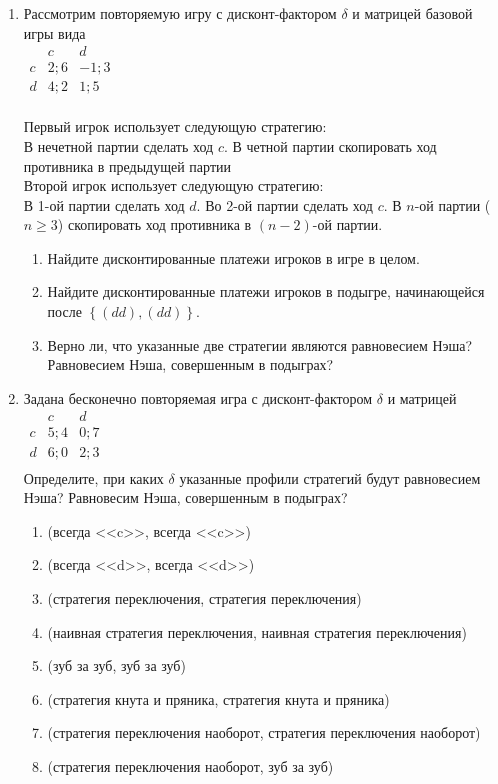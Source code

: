 \documentclass[pdftex,12pt,a4paper]{article}
\begin{document}
\begin{enumerate}
\item Рассмотрим повторяемую игру с дисконт-фактором $\delta $
 и матрицей базовой игры вида\\
$\begin{array}{c|cc}
    {} &  c & d   \\
\hline
    c &  {2;6} & { - 1;3}   \\
    d &  {4;2} & {1;5}   \\
\end{array}$

Первый игрок использует следующую стратегию: \\
В нечетной партии сделать ход $c$. В четной партии скопировать ход противника в предыдущей партии\\
Второй игрок использует следующую стратегию:\\
В 1-ой партии сделать ход $d$. Во 2-ой партии сделать ход $c$. В $n$-ой партии ($n \ge 3$) скопировать ход противника в $\left( {n - 2} \right)$-ой партии. 
\begin{enumerate}
\item Найдите дисконтированные платежи игроков в игре в целом.
\item Найдите дисконтированные платежи игроков в подыгре, начинающейся после $\left\{ {\left( {dd} \right),\left( {dd} \right)} \right\}$.
\item Верно ли, что указанные две стратегии являются равновесием Нэша? Равновесием Нэша, совершенным в подыграх?
\end{enumerate}

\item Задана бесконечно повторяемая игра с дисконт-фактором $\delta$ и матрицей \\
$\begin{array}{c|cc}
 & c & d \\
\hline
c & 5;4 & 0;7 \\
d & 6;0 & 2;3 \\
\end{array}$ \\
Определите, при каких $\delta$ указанные профили стратегий будут равновесием Нэша? Равновесим Нэша, совершенным в подыграх?
\begin{enumerate}
\item (всегда <<c>>, всегда <<c>>) 
\item (всегда <<d>>, всегда <<d>>) 
\item (стратегия переключения, стратегия переключения) 
\item (наивная стратегия переключения, наивная стратегия переключения) 
\item (зуб за зуб, зуб за зуб) 
\item (стратегия кнута и пряника, стратегия кнута и пряника) 
\item (стратегия переключения наоборот, стратегия переключения наоборот) 
\item (стратегия переключения наоборот, зуб за зуб) 
\end{enumerate}


\end{enumerate}
\end{document}
